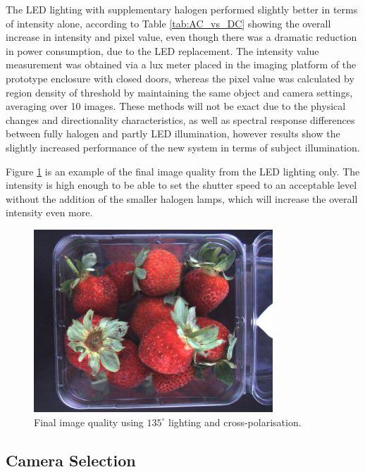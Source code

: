 \documentclass[fleqn,twoside,12pt]{report}
\begin{document}
The LED lighting with supplementary halogen performed slightly better in terms of intensity alone, according to Table \ref{tab:AC_vs_DC} showing the overall increase in intensity and pixel value, even though there was a dramatic reduction in power consumption, due to the LED replacement. The intensity value measurement was obtained via a lux meter placed in the imaging platform of the prototype enclosure with closed doors, whereas the pixel value was calculated by region density of threshold by maintaining the same object and camera settings, averaging over 10 images. These methods will not be exact due to the physical changes and directionality characteristics, as well as spectral response differences between fully halogen and partly LED illumination, however results show the slightly increased performance of the new system in terms of subject illumination. 

Figure \ref{fig:final_image} is an example of the final image quality from the LED lighting only. The intensity is high enough to be able to set the shutter speed to an acceptable level without the addition of the smaller halogen lamps, which will increase the overall intensity even more.


\begin{figure}[h]
	\centering
	\includegraphics[width=0.8\textwidth]{final_image.jpg}
	\caption{Final image quality using $135^{\circ}$ lighting and cross-polarisation.}
	\label{fig:final_image}
\end{figure} 





\subsection{Camera Selection}
\end{document}
